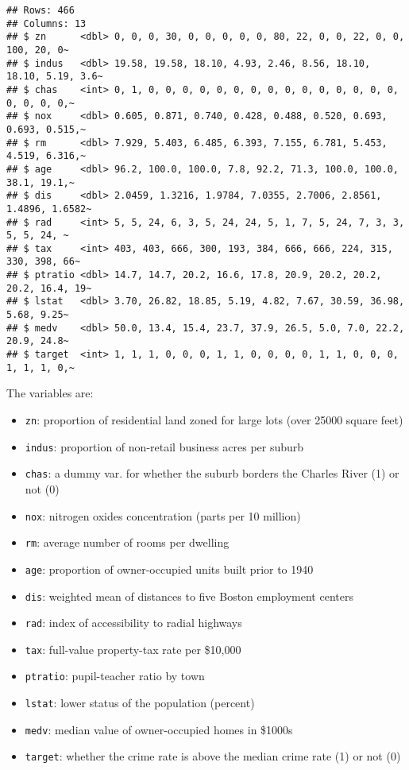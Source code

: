 \documentclass[
]{article}
\providecommand{\tightlist}{%
  \setlength{\itemsep}{0pt}\setlength{\parskip}{0pt}}
\begin{document}
\begin{verbatim}
## Rows: 466
## Columns: 13
## $ zn      <dbl> 0, 0, 0, 30, 0, 0, 0, 0, 0, 80, 22, 0, 0, 22, 0, 0, 100, 20, 0~
## $ indus   <dbl> 19.58, 19.58, 18.10, 4.93, 2.46, 8.56, 18.10, 18.10, 5.19, 3.6~
## $ chas    <int> 0, 1, 0, 0, 0, 0, 0, 0, 0, 0, 0, 0, 0, 0, 0, 0, 0, 0, 0, 0, 0,~
## $ nox     <dbl> 0.605, 0.871, 0.740, 0.428, 0.488, 0.520, 0.693, 0.693, 0.515,~
## $ rm      <dbl> 7.929, 5.403, 6.485, 6.393, 7.155, 6.781, 5.453, 4.519, 6.316,~
## $ age     <dbl> 96.2, 100.0, 100.0, 7.8, 92.2, 71.3, 100.0, 100.0, 38.1, 19.1,~
## $ dis     <dbl> 2.0459, 1.3216, 1.9784, 7.0355, 2.7006, 2.8561, 1.4896, 1.6582~
## $ rad     <int> 5, 5, 24, 6, 3, 5, 24, 24, 5, 1, 7, 5, 24, 7, 3, 3, 5, 5, 24, ~
## $ tax     <int> 403, 403, 666, 300, 193, 384, 666, 666, 224, 315, 330, 398, 66~
## $ ptratio <dbl> 14.7, 14.7, 20.2, 16.6, 17.8, 20.9, 20.2, 20.2, 20.2, 16.4, 19~
## $ lstat   <dbl> 3.70, 26.82, 18.85, 5.19, 4.82, 7.67, 30.59, 36.98, 5.68, 9.25~
## $ medv    <dbl> 50.0, 13.4, 15.4, 23.7, 37.9, 26.5, 5.0, 7.0, 22.2, 20.9, 24.8~
## $ target  <int> 1, 1, 1, 0, 0, 0, 1, 1, 0, 0, 0, 0, 1, 1, 0, 0, 0, 1, 1, 1, 0,~
\end{verbatim}

The variables are:

\begin{itemize}
\tightlist
\item
  \texttt{zn}: proportion of residential land zoned for large lots (over
  25000 square feet)
\item
  \texttt{indus}: proportion of non-retail business acres per suburb
\item
  \texttt{chas}: a dummy var. for whether the suburb borders the Charles
  River (1) or not (0)
\item
  \texttt{nox}: nitrogen oxides concentration (parts per 10 million)
\item
  \texttt{rm}: average number of rooms per dwelling
\item
  \texttt{age}: proportion of owner-occupied units built prior to 1940
\item
  \texttt{dis}: weighted mean of distances to five Boston employment
  centers
\item
  \texttt{rad}: index of accessibility to radial highways
\item
  \texttt{tax}: full-value property-tax rate per \$10,000
\item
  \texttt{ptratio}: pupil-teacher ratio by town
\item
  \texttt{lstat}: lower status of the population (percent)
\item
  \texttt{medv}: median value of owner-occupied homes in \$1000s
\item
  \texttt{target}: whether the crime rate is above the median crime rate
  (1) or not (0)
\end{itemize}
\end{document}
